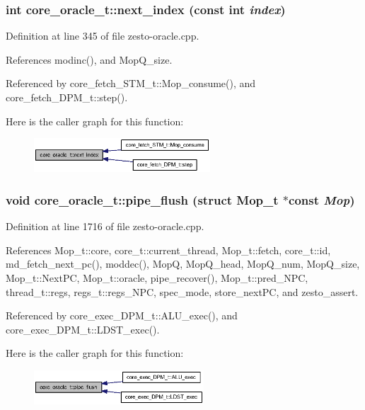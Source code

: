\subsubsection[{next\_\-index}]{\setlength{\rightskip}{0pt plus 5cm}int core\_\-oracle\_\-t::next\_\-index (const int {\em index})}\label{classcore__oracle__t_3d8ea00f353d569980869333b7a92668}




Definition at line 345 of file zesto-oracle.cpp.

References modinc(), and MopQ\_\-size.

Referenced by core\_\-fetch\_\-STM\_\-t::Mop\_\-consume(), and core\_\-fetch\_\-DPM\_\-t::step().

Here is the caller graph for this function:\nopagebreak
\begin{figure}[H]
\begin{center}
\leavevmode
\includegraphics[width=187pt]{classcore__oracle__t_3d8ea00f353d569980869333b7a92668_icgraph}
\end{center}
\end{figure}
\subsubsection[{pipe\_\-flush}]{\setlength{\rightskip}{0pt plus 5cm}void core\_\-oracle\_\-t::pipe\_\-flush (struct {\bf Mop\_\-t} $\ast$const  {\em Mop})}\label{classcore__oracle__t_d79ed0d31e9421037f71a3aae2aa0cbb}




Definition at line 1716 of file zesto-oracle.cpp.

References Mop\_\-t::core, core\_\-t::current\_\-thread, Mop\_\-t::fetch, core\_\-t::id, md\_\-fetch\_\-next\_\-pc(), moddec(), MopQ, MopQ\_\-head, MopQ\_\-num, MopQ\_\-size, Mop\_\-t::NextPC, Mop\_\-t::oracle, pipe\_\-recover(), Mop\_\-t::pred\_\-NPC, thread\_\-t::regs, regs\_\-t::regs\_\-NPC, spec\_\-mode, store\_\-nextPC, and zesto\_\-assert.

Referenced by core\_\-exec\_\-DPM\_\-t::ALU\_\-exec(), and core\_\-exec\_\-DPM\_\-t::LDST\_\-exec().

Here is the caller graph for this function:\nopagebreak
\begin{figure}[H]
\begin{center}
\leavevmode
\includegraphics[width=180pt]{classcore__oracle__t_d79ed0d31e9421037f71a3aae2aa0cbb_icgraph}
\end{center}
\end{figure}
